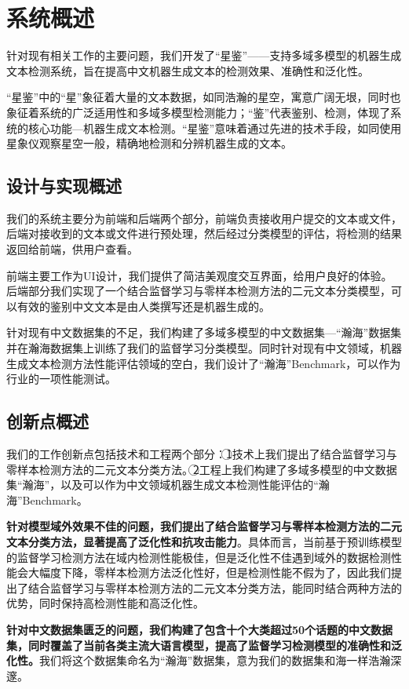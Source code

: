 \documentclass[a4paper]{report}
\begin{document}
\section{系统概述}
针对现有相关工作的主要问题，我们开发了“星鉴”——支持多域多模型的机器生成文本检测系统，旨在提高中文机器生成文本的检测效果、准确性和泛化性。

“星鉴”中的“星”象征着大量的文本数据，如同浩瀚的星空，寓意广阔无垠，同时也象征着系统的广泛适用性和多域多模型检测能力；“鉴”代表鉴别、检测，体现了系统的核心功能---机器生成文本检测。“星鉴”意味着通过先进的技术手段，如同使用星象仪观察星空一般，精确地检测和分辨机器生成的文本。

\subsection{设计与实现概述}

我们的系统主要分为前端和后端两个部分，前端负责接收用户提交的文本或文件，后端对接收到的文本或文件进行预处理，然后经过分类模型的评估，将检测的结果返回给前端，供用户查看。

前端主要工作为UI设计，我们提供了简洁美观度交互界面，给用户良好的体验。后端部分我们实现了一个结合监督学习与零样本检测方法的二元文本分类模型，可以有效的鉴别中文文本是由人类撰写还是机器生成的。

针对现有中文数据集的不足，我们构建了多域多模型的中文数据集---“瀚海”数据集并在瀚海数据集上训练了我们的监督学习分类模型。同时针对现有中文领域，机器生成文本检测方法性能评估领域的空白，我们设计了“瀚海”Benchmark，可以作为行业的一项性能测试。

\subsection{创新点概述}

我们的工作创新点包括技术和工程两个部分：\textcircled{1}技术上我们提出了结合监督学习与零样本检测方法的二元文本分类方法。\textcircled{2}工程上我们构建了多域多模型的中文数据集“瀚海”，以及可以作为中文领域机器生成文本检测性能评估的“瀚海”Benchmark。

\textbf{针对模型域外效果不佳的问题，我们提出了结合监督学习与零样本检测方法的二元文本分类方法，显著提高了泛化性和抗攻击能力}。具体而言，当前基于预训练模型的监督学习检测方法在域内检测性能极佳，但是泛化性不佳遇到域外的数据检测性能会大幅度下降，零样本检测方法泛化性好，但是检测性能不假为了，因此我们提出了结合监督学习与零样本检测方法的二元文本分类方法，能同时结合两种方法的优势，同时保持高检测性能和高泛化性。

\textbf{针对中文数据集匮乏的问题，我们构建了包含十个大类超过50个话题的中文数据集，同时覆盖了当前各类主流大语言模型，提高了监督学习检测模型的准确性和泛化性。}我们将这个数据集命名为“瀚海”数据集，意为我们的数据集和海一样浩瀚深邃。
\end{document}
